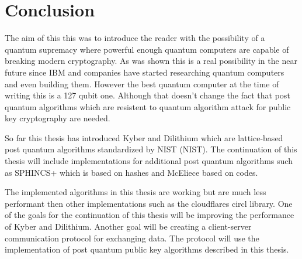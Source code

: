\chapter*{Conclusion}
{}

The aim of this this was to introduce the reader with the possibility of a quantum supremacy where powerful enough quantum computers are capable of breaking modern cryptography. As was shown this is a real possibility in the near future since IBM and companies have started researching quantum computers and even building them. However the best quantum computer at the time of writing this is a 127 qubit one. Although that doesn't change the fact that post quantum algorithms which are resistent to quantum algorithm attack for public key cryptography are needed.

So far this thesis has introduced Kyber and Dilithium which are lattice-based post quantum algorithms standardized by NIST (\acl{NIST}). The continuation of this thesis will include implementations for additional post quantum algorithms such as SPHINCS+ which is based on hashes and McEliece based on codes.

The implemented algorithms in this thesis are working but are much less performant then other implementations such as the cloudflares circl library. One of the goals for the continuation of this thesis will be improving the performance of Kyber and Dilithium. Another goal will be creating a client-server  communication protocol for exchanging data. The protocol will use the implementation of post quantum public key algorithms described in this thesis.